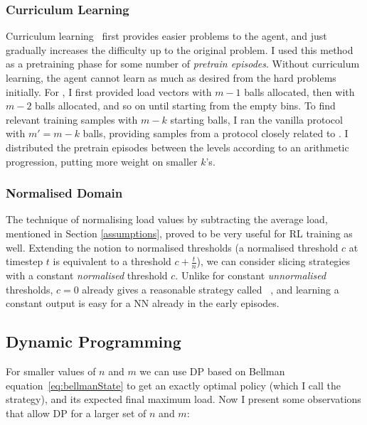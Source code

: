 \subsubsection*{Curriculum Learning}


Curriculum learning~\cite{bengio2009curriculumoriginal} first provides easier problems to the agent, and just gradually increases the difficulty up to the original problem. I used this method as a pretraining phase for some number of \textit{pretrain episodes}. Without curriculum learning, the agent cannot learn as much as desired from the hard problems initially. For \TwoThinning, I first provided load vectors with $m-1$ balls allocated, then with $m-2$ balls allocated, and so on until starting from the empty bins. To find relevant training samples with $m-k$ starting balls, I ran the vanilla \OneChoice protocol with $m'=m-k$ balls, providing samples from a protocol closely related to \TwoThinning. I distributed the pretrain episodes between the levels according to an arithmetic progression, putting more weight on smaller $k$'s.



\subsubsection*{Normalised Domain} \label{normalised-domain}

The technique of normalising load values by subtracting the average load, mentioned in Section \ref{assumptions}, proved to be very useful for RL training as well. Extending the notion to normalised thresholds (a normalised threshold $c$ at timestep $t$ is equivalent to a threshold $c+\frac{t}{n}$), we can consider slicing strategies with a constant \textit{normalised} threshold $c$. Unlike for constant \textit{unnormalised} thresholds, $c=0$ already gives a reasonable strategy called \MeanThinning~\cite{los2022cachingpackingthinningtwinning}, and learning a constant output is easy for a NN already in the early episodes.


\subsection{Dynamic Programming} \label{two-thinning-dp}


For smaller values of $n$ and $m$ we can use DP based on Bellman equation~\eqref{eq:bellmanState} to get an exactly optimal policy (which I call the \DP strategy), and its expected final maximum load. Now I present some observations that allow DP for a larger set of $n$ and $m$:


